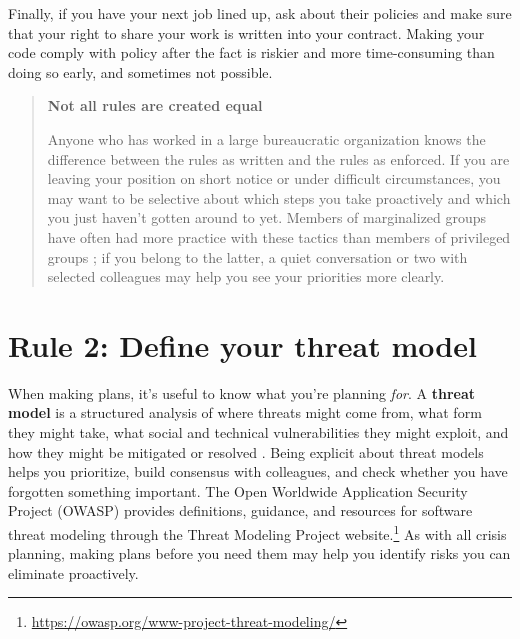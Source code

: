 \documentclass[10pt,letterpaper]{article}
\begin{document}
Finally,
if you have your next job lined up,
ask about their policies
and make sure that your right to share your work is written into your contract.
Making your code comply with policy after the fact is riskier and more time-consuming than doing so early,
and sometimes not possible.

\begin{quote}
  \noindent
  \textbf{Not all rules are created equal}

  Anyone who has worked in a large bureaucratic organization knows
  the difference between the rules as written and the rules as enforced.
  If you are leaving your position on short notice or under difficult circumstances,
  you may want to be selective about which steps you take proactively
  and which you just haven't gotten around to yet.
  Members of marginalized groups have often had more practice with these tactics
  than members of privileged groups \cite{Scott1987};
  if you belong to the latter,
  a quiet conversation or two with selected colleagues may help you see your priorities more clearly.
\end{quote}

\section*{Rule 2: Define your threat model}

When making plans, it's useful to know what you're planning \emph{for}.
A \textbf{threat model} is a structured analysis of where threats might come from,
what form they might take,
what social and technical vulnerabilities they might exploit,
and how they might be mitigated or resolved \cite{Torr2005}.
Being explicit about threat models helps you prioritize,
build consensus with colleagues,
and check whether you have forgotten something important.
The Open Worldwide Application Security Project (OWASP) provides definitions, guidance, and resources for software threat modeling through the Threat Modeling Project website.\footnote{\url{https://owasp.org/www-project-threat-modeling/}}
As with all crisis planning,
making plans before you need them may help you identify risks you can eliminate proactively.
\end{document}
